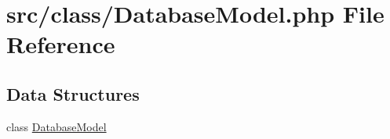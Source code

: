 \hypertarget{_database_model_8php}{}\section{src/class/\+Database\+Model.php File Reference}
\label{_database_model_8php}
\subsection*{Data Structures}
\begin{DoxyCompactItemize}
\item 
class \hyperlink{class_database_model}{Database\+Model}
\end{DoxyCompactItemize}
